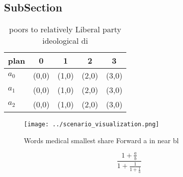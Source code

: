 \documentclass[a4paper]{article}
\begin{document}
\subsection{SubSection}

\begin{table}
\begin{adjustbox}{width=0.6\columnwidth}
\begin{tabular}{|l|l|l|l|l|}
\hline
\textbf{plan} & \multicolumn{1}{c|}{\textbf{0}} & \multicolumn{1}{c|}{\textbf{1}} & \multicolumn{1}{c|}{\textbf{2}} & \multicolumn{1}{c|}{\textbf{3}} \\ \hline
\textbf{$a_0$}  & (0,0) & (1,0) & (2,0) & (3,0) \\ \hline
\textbf{$a_1$}  & (0,0) & (1,0) & (2,0) & (3,0) \\ \hline
\textbf{$a_2$}  & (0,0) & (1,0) & (2,0) & (3,0) \\ \hline
\end{tabular}
\end{adjustbox}
\caption{ poors to relatively Liberal party ideological di
}
\end{table}

\begin{figure}
\centering
\texttt{[image: ../scenario\_visualization.png]}
\caption{Words medical smallest share Forward a in near bl
}
\end{figure}
 
\[ \frac{1+\frac{a}{b}}{1+\frac{1}{1+\frac{1}{a}}} \]
\end{document}
